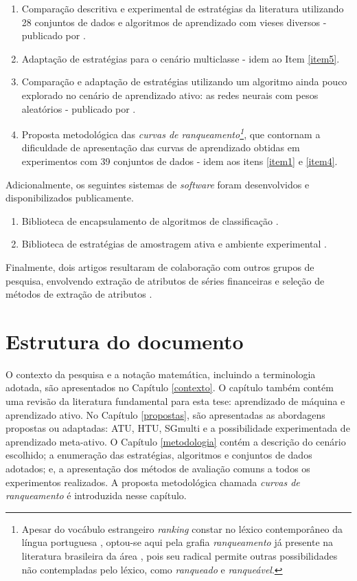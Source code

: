 \begin{enumerate}[resume]
   \item \label{item5} Comparação descritiva e experimental de estratégias da literatura utilizando 28 conjuntos de dados e algoritmos de aprendizado com vieses diversos - publicado por .
   \item Adaptação de estratégias para o cenário multiclasse - idem ao Item \ref{item5}.
   \item Comparação e adaptação de estratégias utilizando um algoritmo ainda pouco explorado no cenário de aprendizado ativo: as redes neurais com pesos aleatórios \cite{schmidt1992feedforward} - publicado por .
   \item Proposta metodológica das \textit{curvas de ranqueamento\footnote{Apesar do vocábulo estrangeiro \textit{ranking} constar no léxico contemporâneo da língua portuguesa \cite{academia2004vocabulario}, optou-se aqui pela grafia \textit{ranqueamento} já presente na literatura brasileira da área \cite{colares2005processo}, pois seu radical permite outras possibilidades não contempladas pelo léxico, como \textit{ranqueado} e \textit{ranqueável}.}}, que contornam a dificuldade de apresentação das curvas de aprendizado obtidas em experimentos com 39 conjuntos de dados - idem aos itens \ref{item1} e \ref{item4}.
\end{enumerate}

Adicionalmente, os seguintes sistemas de \textit{software} foram desenvolvidos e disponibilizados publicamente.
\begin{enumerate}[resume]
  \item Biblioteca de encapsulamento de algoritmos de classificação \cite{doi/ml}.
  \item Biblioteca de estratégias de amostragem ativa e ambiente experimental \cite{doi/al}.
\end{enumerate}
Finalmente, dois artigos resultaram de colaboração com outros grupos de pesquisa, envolvendo extração de atributos de séries financeiras \cite{conf/dexa/BedoSKT13} e seleção de métodos de extração de atributos \cite{Bedo2015jdi}.

\section{Estrutura do documento}\label{estrutura}
O contexto da pesquisa e a notação matemática, incluindo a terminologia adotada, são apresentados no Capítulo \ref{contexto}.
O capítulo também contém uma revisão da literatura fundamental para esta tese: aprendizado de máquina e aprendizado ativo.
No Capítulo \ref{propostas}, são apresentadas as abordagens propostas ou adaptadas: ATU, HTU, SGmulti e a possibilidade experimentada de aprendizado meta-ativo.
O Capítulo \ref{metodologia} contém a descrição do cenário escolhido; a enumeração das estratégias, algoritmos e conjuntos de dados adotados; e, a apresentação dos métodos de avaliação comuns a todos os experimentos realizados.
A proposta metodológica chamada \textit{curvas de ranqueamento} é introduzida nesse capítulo.

